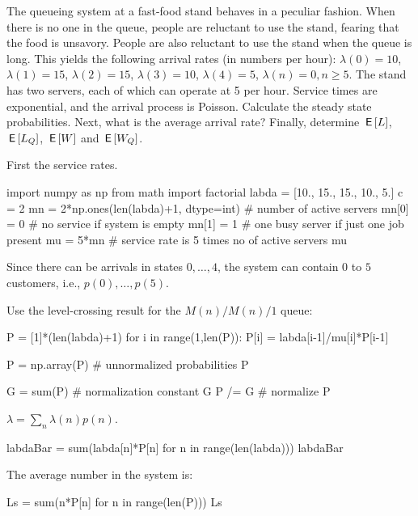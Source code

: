 \begin{extra}[Hall 5.8] The queueing system at a fast-food stand behaves in a peculiar fashion.
 When there is no one in the queue, people are reluctant to use the stand, fearing that the food is unsavory.
 People are also reluctant to use the stand when the queue is long.
 This yields the following arrival rates (in numbers per hour): $\lambda(0) = 10$, $\lambda(1)=15$, $\lambda(2)=15$, $\lambda(3)=10$, $\lambda(4)=5$, $\lambda(n)=0, n\geq 5$.
 The stand has two servers, each of which can operate at 5 per hour.
 Service times are exponential, and the arrival process is Poisson.
 Calculate the steady state probabilities.
 Next, what is the average arrival rate?
 Finally, determine $\,\mathsf{E}\left[L\right]$, $\,\mathsf{E}\left[L_Q\right]$, $\,\mathsf{E}\left[W\right]$ and $\,\mathsf{E}\left[W_Q\right]$.
\begin{solution}
First the service rates.
\begin{pyconsole}
import numpy as np
from math import factorial
labda = [10., 15., 15., 10., 5.]
c = 2
mn = 2*np.ones(len(labda)+1, dtype=int) # number of active servers
mn[0] = 0 # no service if system is empty
mn[1] = 1 # one busy server if just one job present
mu = 5*mn # service rate is 5 times no of active servers
mu
\end{pyconsole}

Since there can be arrivals in states $0,\ldots, 4$, the system can contain $0$ to $5$ customers, i.e., $p(0),\ldots, p(5)$.

Use the level-crossing result for the $M(n)/M(n)/1$ queue:

\begin{pyconsole}
P = [1]*(len(labda)+1)
for i in range(1,len(P)):
 P[i] = labda[i-1]/mu[i]*P[i-1]

P = np.array(P) # unnormalized probabilities
P
\end{pyconsole}

\begin{pyconsole}
G = sum(P) # normalization constant
G
P /= G # normalize
P 
\end{pyconsole} 

$\lambda = \sum_{n}\lambda(n) p(n)$.

\begin{pyconsole}
labdaBar = sum(labda[n]*P[n] for n in range(len(labda)))
labdaBar
\end{pyconsole}


The average number in the system is: 

\begin{pyconsole}
Ls = sum(n*P[n] for n in range(len(P)))
Ls
\end{pyconsole}



\end{solution}
\end{extra}
